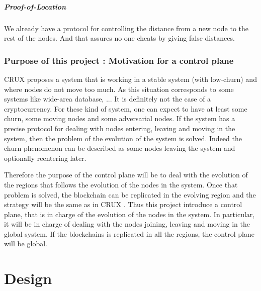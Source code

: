 \documentclass[a4paper,11pt,oneside]{report}
\begin{document}
\paragraph{Proof-of-Location} We already have a protocol for controlling
the distance from a new node to the rest of the nodes. And that assures no one
cheats by giving false distances. 

\subsection{Purpose of this project : Motivation for a control plane}

CRUX \cite{Basescu2014} proposes a system that is working in a stable system
(with low-churn) and where nodes do not move too much. As this situation
corresponds to some systems like wide-area database, ... It is definitely not
the case of a cryptocurrency.  For these kind of system, one can expect to have
at least some churn, some moving nodes and some adversarial nodes.  If the
system has a precise protocol for dealing with nodes entering, leaving and
moving in the system, then the problem of the evolution of the system is
solved. Indeed the churn phenomenon can be described as some nodes leaving the
system and optionally reentering later. 

Therefore the purpose of the control plane will be to deal with the evolution
of the regions that follows the evolution of the nodes in the system. Once that
problem is solved, the blockchain can be replicated in the evolving region and
the strategy will be the same as in CRUX \cite{Basescu2014}. Thus this project
introduce a control plane, that is in charge of the evolution of the nodes in
the system. In particular, it will be in charge of dealing with the nodes
joining, leaving and moving in the global system. If the blockchains is
replicated in all the regions, the control plane will be global. 

\chapter{Design} \label{chap:Design}
\end{document}
